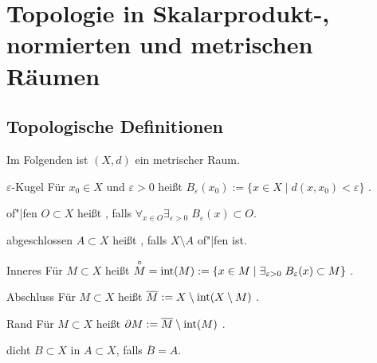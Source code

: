 \section{%
    Topologie in Skalarprodukt-, normierten und metrischen Räumen%
}

\subsection{%
    Topologische Definitionen%
}

\begin{Bem}
    Im Folgenden ist $(X, d)$ ein metrischer Raum.
\end{Bem}

\begin{Def}{$\varepsilon$-Kugel}
    Für $x_0 \in X$ und $\varepsilon > 0$ heißt
    $B_\varepsilon(x_0) := \{x \in X \;|\; d(x, x_0) < \varepsilon\}$
    .
\end{Def}

\begin{Def}{of"|fen}
    $O \subset X$ heißt , falls
    $\forall_{x \in O} \exists_{\varepsilon > 0}\; B_\varepsilon(x) \subset O$.
\end{Def}

\begin{Def}{abgeschlossen}
    $A \subset X$ heißt , falls $X \setminus A$ of"|fen ist.
\end{Def}

\vspace{-2mm}

\begin{Def}{Inneres}
    Für $M \subset X$ heißt $\overset{\circ}{M} = \operatorname{int}(M) :=
    \{x \in M \;|\; \exists_{\varepsilon > 0}\; B_\varepsilon(x) \subset M\}$
    .
\end{Def}

\begin{Def}{Abschluss}
    Für $M \subset X$ heißt $\overline{M} := X \setminus \operatorname{int}(X \setminus M)$
    .
\end{Def}

\begin{Def}{Rand}
    Für $M \subset X$ heißt $\partial M := \overline{M} \setminus \operatorname{int}(M)$
    .
\end{Def}

\begin{Def}{dicht}
    $B \subset X$  in $A \subset X$, falls $\overline{B} = A$.
\end{Def}

